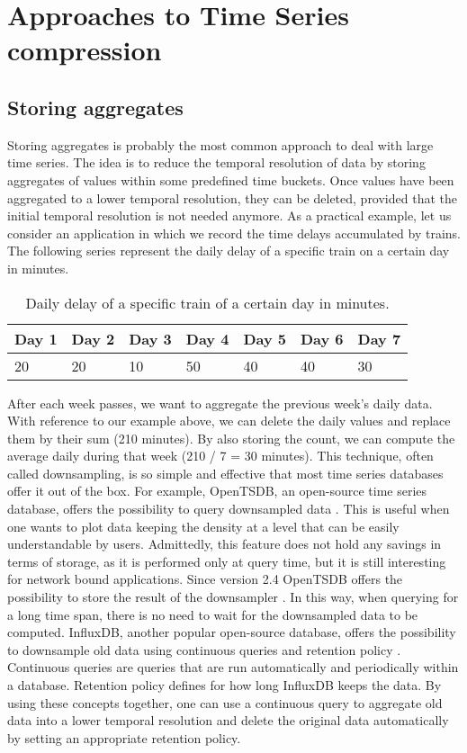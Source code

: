 \chapter{Approaches to Time Series compression}
\section{Storing aggregates}
Storing aggregates is probably the most common approach to deal with large time series.
The idea is to reduce the temporal resolution of data by storing aggregates of values within
some predefined time buckets. Once values have been aggregated to a lower temporal resolution,
they can be deleted, provided that the initial temporal resolution is not needed anymore.
As a practical example, let us consider an application in which we record the time delays
accumulated by trains. The following series represent the daily delay of a specific train on
a certain day in minutes.
\begin{table}[!htbp]
\centering
\begin{tabular}{l|l|l|l|l|l|l}
\textbf{Day 1} & \textbf{Day 2} & \textbf{Day 3} & \textbf{Day 4} & \textbf{Day 5} & \textbf{Day 6} & \textbf{Day 7} \\
\hline
20 & 20 & 10 & 50 & 40 & 40 & 30 \\                
\end{tabular}
\caption{Daily delay of a specific train of a certain day in minutes.}
\label{tab:daily_delay}
\end{table}

After each week passes, we want to aggregate the previous week’s daily data. With reference
to our example above, we can delete the daily values and replace them by their sum
(210 minutes). By also storing the count, we can compute the average daily during that week
(210 / 7 = 30 minutes).
This technique, often called downsampling, is so simple and effective that most time series
databases offer it out of the box. For example, OpenTSDB, an open-source time series database,
offers the possibility to query downsampled data \cite{A2019Downsample}. This is useful when
one wants to plot data keeping the density at a level that can be easily understandable by
users. Admittedly, this feature does not hold any savings in terms of storage, as it is
performed only at query time, but it is still interesting for network bound applications.
Since version 2.4 OpenTSDB offers the possibility to store the result of the downsampler
\cite{A2019Rollup}. In this way, when querying for a long time span, there is no need to wait for the
downsampled data to be computed.
InfluxDB, another popular open-source database, offers the possibility to downsample old
data using continuous queries and retention policy \cite{A2016Downsampling}. Continuous queries
are queries that are run automatically and periodically within a database. Retention policy
defines for how long InfluxDB keeps the data. By using these concepts together, one can use
a continuous query to aggregate old data into a lower temporal resolution and delete the
original data automatically by setting an appropriate retention policy.

